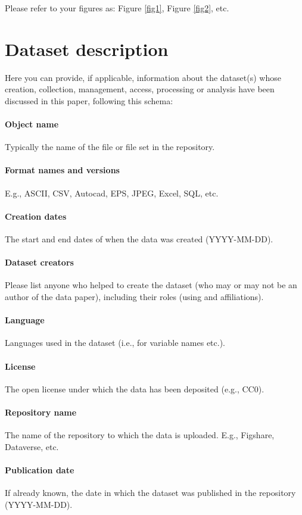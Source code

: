 \documentclass{article}
\begin{document}
\noindent Please refer to your figures as: Figure \ref{fig1}, Figure \ref{fig2}, etc.


\section{Dataset description}
Here you can provide, if applicable, information about the dataset(s) whose creation, collection, management, access, processing or analysis have been discussed in this paper, following this schema:
\paragraph{Object name} Typically the name of the file or file set in the repository.
\paragraph{Format names and versions} E.g., ASCII, CSV, Autocad, EPS, JPEG, Excel, SQL, etc.
\paragraph{Creation dates} The start and end dates of when the data was created (YYYY-MM-DD).
\paragraph{Dataset creators} Please list anyone who helped to create the dataset (who may or may not be an author of the data paper), including their roles (using and affiliations).
\paragraph{Language} Languages used in the dataset (i.e., for variable names etc.).
\paragraph{License} The open license under which the data has been deposited (e.g., CC0). 
\paragraph{Repository name} The name of the repository to which the data is uploaded. E.g., Figshare, Dataverse, etc. 
\paragraph{Publication date} If already known, the date in which the dataset was published in the repository (YYYY-MM-DD).
\end{document}
